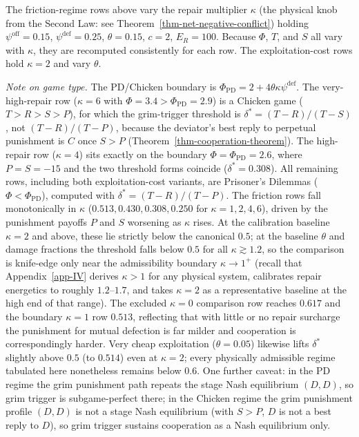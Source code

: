 \documentclass[11pt]{article}
\theoremstyle{plain}
\theoremstyle{definition}
\theoremstyle{remark}
\newenvironment{tablenote}
  {\par\addvspace{2pt}\footnotesize\noindent}
  {\par\addvspace{4pt}}
\newcounter{none}
\begin{document}
\begin{tablenote}

The friction-regime rows above vary the repair multiplier \(\kappa\)
(the physical knob from the Second Law: see
Theorem~\ref{thm-net-negative-conflict}) holding
\(\psi^{\text{off}} = 0.15\), \(\psi^{\text{def}} = 0.25\),
\(\theta = 0.15\), \(c = 2\), \(E_R = 100\). Because \(\Phi\), \(T\),
and \(S\) all vary with \(\kappa\), they are recomputed consistently for
each row. The exploitation-cost rows hold \(\kappa = 2\) and vary
\(\theta\).

\emph{Note on game type.} The PD/Chicken boundary is
\(\Phi_{\text{PD}} = 2 + 4\theta\kappa\psi^{\text{def}}\). The
very-high-repair row (\(\kappa = 6\) with
\(\Phi = 3.4 > \Phi_{\text{PD}} = 2.9\)) is a Chicken game
(\(T > R > S > P\)), for which the grim-trigger threshold is
\(\delta^* = (T - R)/(T - S)\), not \((T - R)/(T - P)\), because the
deviator's best reply to perpetual punishment is \(C\) once \(S > P\)
(Theorem~\ref{thm-cooperation-theorem}). The high-repair row
(\(\kappa = 4\)) sits exactly on the boundary
\(\Phi = \Phi_{\text{PD}} = 2.6\), where \(P = S = -15\) and the two
threshold forms coincide (\(\delta^* = 0.308\)). All remaining rows,
including both exploitation-cost variants, are Prisoner's Dilemmas
(\(\Phi < \Phi_{\text{PD}}\)), computed with
\(\delta^* = (T - R)/(T - P)\). The friction rows fall monotonically in
\(\kappa\) (\(0.513, 0.430, 0.308, 0.250\) for \(\kappa = 1, 2, 4, 6\)),
driven by the punishment payoffs \(P\) and \(S\) worsening as \(\kappa\)
rises. At the calibration baseline \(\kappa = 2\) and above, these lie
strictly below the canonical \(0.5\); at the baseline \(\theta\) and
damage fractions the threshold falls below \(0.5\) for all
\(\kappa \gtrsim 1.2\), so the comparison is knife-edge only near the
admissibility boundary \(\kappa \to 1^+\) (recall that
Appendix~\ref{app-IV} derives \(\kappa > 1\) for any physical system,
calibrates repair energetics to roughly \(1.2\)--\(1.7\), and takes
\(\kappa = 2\) as a representative baseline at the high end of that
range). The excluded \(\kappa = 0\) comparison row reaches \(0.617\) and
the boundary \(\kappa = 1\) row \(0.513\), reflecting that with little
or no repair surcharge the punishment for mutual defection is far milder
and cooperation is correspondingly harder. Very cheap exploitation
(\(\theta = 0.05\)) likewise lifts \(\delta^*\) slightly above \(0.5\)
(to \(0.514\)) even at \(\kappa = 2\); every physically admissible
regime tabulated here nonetheless remains below \(0.6\). One further
caveat: in the PD regime the grim punishment path repeats the stage Nash
equilibrium \((D,D)\), so grim trigger is subgame-perfect there; in the
Chicken regime the grim punishment profile \((D,D)\) is not a stage Nash
equilibrium (with \(S > P\), \(D\) is not a best reply to \(D\)), so
grim trigger sustains cooperation as a Nash equilibrium only.

\end{tablenote}
\end{document}
